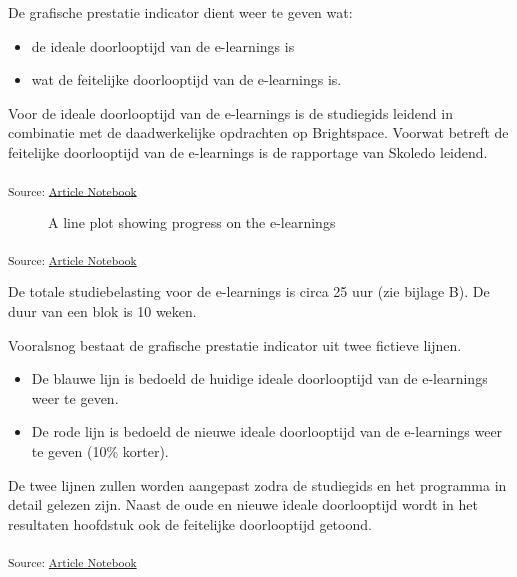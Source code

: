 \documentclass[
  a4paper,
  DIV=11,
  numbers=noendperiod]{scrartcl}
\providecommand{\tightlist}{%
  \setlength{\itemsep}{0pt}\setlength{\parskip}{0pt}}\usepackage{longtable,booktabs,array}
\begin{document}
De grafische prestatie indicator dient weer te geven wat:

\begin{itemize}
\tightlist
\item
  de ideale doorlooptijd van de e-learnings is
\item
  wat de feitelijke doorlooptijd van de e-learnings is.
\end{itemize}

Voor de ideale doorlooptijd van de e-learnings is de studiegids leidend
in combinatie met de daadwerkelijke opdrachten op Brightspace. Voorwat
betreft de feitelijke doorlooptijd van de e-learnings is de rapportage
van Skoledo leidend.

\textsubscript{Source:
\href{https://jan-ru.github.io/lss_greenbelt/1_definitie_fase.qmd.html}{Article
Notebook}}

\begin{figure}[H]


\caption{\label{fig-lineplot}A line plot showing progress on the
e-learnings}

\end{figure}%

\textsubscript{Source:
\href{https://jan-ru.github.io/lss_greenbelt/1_definitie_fase.qmd.html}{Article
Notebook}}

De totale studiebelasting voor de e-learnings is circa 25 uur (zie
bijlage B). De duur van een blok is 10 weken.

Vooralsnog bestaat de grafische prestatie indicator uit twee fictieve
lijnen.

\begin{itemize}
\tightlist
\item
  De {blauwe} lijn is bedoeld de huidige ideale doorlooptijd van de
  e-learnings weer te geven.
\item
  De {rode} lijn is bedoeld de nieuwe ideale doorlooptijd van de
  e-learnings weer te geven (10\% korter).
\end{itemize}

De twee lijnen zullen worden aangepast zodra de studiegids en het
programma in detail gelezen zijn. Naast de oude en nieuwe ideale
doorlooptijd wordt in het resultaten hoofdstuk ook de feitelijke
doorlooptijd getoond.

\textsubscript{Source:
\href{https://jan-ru.github.io/lss_greenbelt/1_definitie_fase.qmd.html}{Article
Notebook}}
\end{document}
